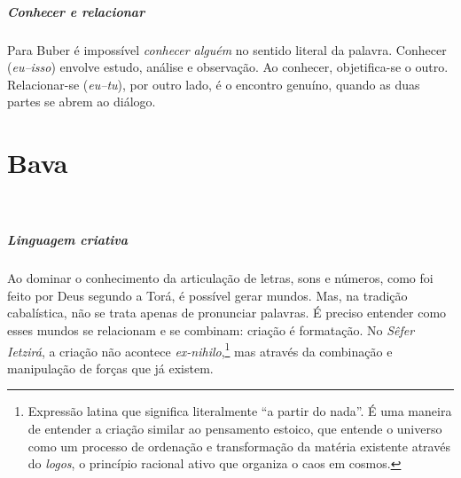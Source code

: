 \paragraph{Conhecer e relacionar} Para Buber é impossível \textit{conhecer alguém} no sentido literal da palavra. Conhecer (\textit{eu--isso}) envolve estudo, análise e observação. Ao conhecer, objetifica-se o outro. Relacionar-se (\textit{eu--tu}), por outro lado, é o encontro genuíno, quando as duas partes se abrem ao diálogo. 

\chapter*{Bava 
\smallskip{}}

\begin{center}
{\huge{}}\\\medskip{\footnotesize\formularlight{
\lipsum[2]
}}
\end{center}


\paragraph{Linguagem criativa} Ao dominar o conhecimento da articulação de letras, sons e números, como foi feito por Deus segundo a Torá, é possível gerar mundos. Mas, na tradição cabalística, não se trata apenas de pronunciar palavras. É preciso entender como esses mundos se relacionam e se combinam: criação é formatação. No \textit{Sêfer Ietzirá}, a criação não acontece \textit{ex-nihilo},\footnote{Expressão latina que significa literalmente ``a partir do nada''. É uma maneira de entender a criação similar ao pensamento estoico, que entende o universo como um processo de ordenação e transformação da matéria existente através do \textit{logos}, o princípio racional ativo que organiza o caos em cosmos.} mas através da combinação e manipulação de forças que já existem.

